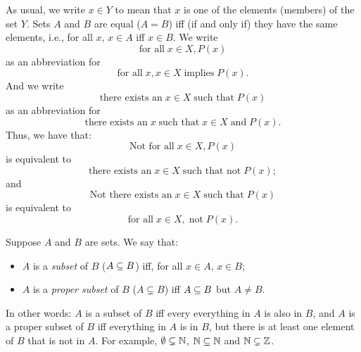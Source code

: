 As usual, we write $x\in Y$
%
%
%
%
to mean that $x$ is one of the elements (members) of the set $Y$.
Sets $A$ and $B$ are equal ($A=B$)
%
%
%
%
iff (if and only if) they have the same elements, i.e., for all $x$,
%
$x\in A$ iff $x\in B$.
We write
\begin{displaymath}
  \textrm{for all}\; x \in X, P(x)
\end{displaymath}
as an abbreviation for
\begin{displaymath}
  \textrm{for all}\; x, x\in X \mathbin{\textrm{implies}} P(x) .
\end{displaymath}
And we write 
\begin{displaymath}
  \textrm{there exists an}\; x \in X \;\textrm{such that}\; P(x)
\end{displaymath}
as an abbreviation for
\begin{displaymath}
  \textrm{there exists an}\; x \;\textrm{such that}\; x\in X
  \mathbin{\textrm{and}} P(x) .
\end{displaymath}
Thus, we have that:
\begin{displaymath}
\textrm{Not for all}\; x\in X, P(x)  
\end{displaymath}
is equivalent to
\begin{displaymath}
\textrm{there exists an}\; x\in X \;\textrm{such that not}\; P(x);
\end{displaymath}
and
\begin{displaymath}
\textrm{Not there exists an}\; x\in X \;\textrm{such that}\; P(x)  
\end{displaymath}
is equivalent to
\begin{displaymath}
\textrm{for all}\; x\in X, \;\textrm{not}\; P(x) .  
\end{displaymath}

Suppose $A$ and $B$ are sets.  We say that:
\begin{itemize}
\item $A$ is a \emph{subset}
%
%
of $B$ ($A\subseteq B$)
%
%
iff, for all $x\in A$, $x\in B$;

\item $A$ is a
\emph{proper subset}
%
%
%
of $B$ ($A\subsetneq B$)
%
%
iff $A\subseteq B$ but $A\neq B$.
\end{itemize}
In other words: $A$ is a subset of $B$ iff every everything in $A$ is
also in $B$, and $A$ is a proper subset of $B$ iff everything in $A$
is in $B$, but there is at least one element of $B$ that is not in
$A$. For example, $\emptyset\subsetneq\mathbb{N}$, $\mathbb{N}\subseteq\mathbb{N}$ and
$\mathbb{N}\subsetneq\mathbb{Z}$.

